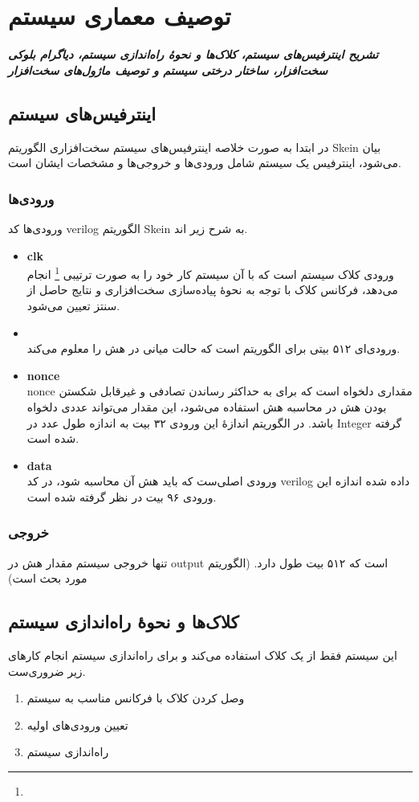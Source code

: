 \chapter{توصیف معماری سیستم}
\noindent
\textbf{
\textit{
تشریح اینترفیس‌های سیستم، کلاک‌ها و نحوهٔ راه‌اندازی سیستم، دیاگرام بلوکی سخت‌افزار، ساختار درختی سیستم و توصیف ماژول‌های سخت‌افزار 
}
}
\pagebreak

\section{ اینترفیس‌های سیستم}
در ابتدا به صورت خلاصه اینترفیس‌های سیستم سخت‌افزاری الگوریتم Skein بیان می‌شود، اینترفیس یک سیستم شامل ورودی‌ها و خروجی‌ها و مشخصات ایشان است. 
\subsection{ورودی‌ها}
ورودی‌ها کد verilog الگوریتم Skein به شرح زیر اند.
\begin{itemize}
\item
\textbf{clk}\\
ورودی کلاک سیستم است که با آن سیستم کار خود را به صورت ترتیبی 
\footnote{}
انجام می‌دهد، فرکانس کلاک با توجه به نحوهٔ پیاده‌سازی سخت‌افزاری و نتایج حاصل از سنتز تعیین می‌شود.
\item
\textbf{}\\
ورودی‌ای ۵۱۲ بیتی برای الگوریتم
  است که حالت میانی در هش را معلوم می‌کند.
\item
\textbf{nonce}\\
nonce مقداری دلخواه است که برای به حداکثر رساندن تصادفی  و غیرقابل شکستن بودن هش 
در محاسبه هش استفاده می‌شود، این مقدار می‌تواند عددی دلخواه باشد. در الگوریتم 
 اندازهٔ این ورودی ۳۲ بیت به اندازه طول عدد در Integer گرفته شده است.
\item
\textbf{data}\\
ورودی اصلی‌ست که باید هش آن محاسبه شود، در کد verilog داده شده اندازه این ورودی ۹۶ بیت در نظر گرفته شده است. 
\end{itemize}

\subsection{خروجی}
تنها خروجی سیستم مقدار هش در output است که ۵۱۲ بیت طول دارد.
(الگوریتم مورد بحث 
 است)

\section{کلاک‌ها و نحوهٔ راه‌اندازی سیستم}
این سیستم فقط از یک کلاک استفاده می‌کند و برای راه‌اندازی سیستم انجام کارهای زیر ضروری‌ست.
\begin{enumerate}
\item
وصل کردن کلاک با فرکانس مناسب به سیستم
\item 
تعیین ورودی‌های اولیه 
\item 
راه‌اندازی سیستم 
\end{enumerate}


